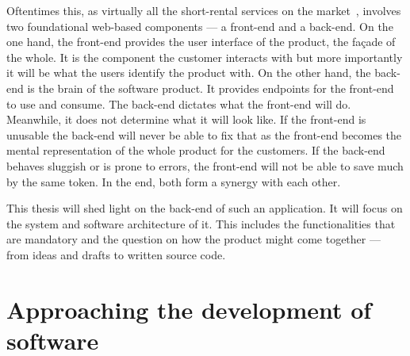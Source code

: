 \documentclass[12pt,a4paper]{report}
\begin{document}
Oftentimes this, as virtually all the short-rental services on the market~\cn,
involves two foundational web-based components --- a front-end and a back-end\cn.
On the one hand, the front-end provides the user interface of the product, the façade of the whole.
It is the component the customer interacts with but more importantly it will be
what the users identify the product with.
On the other hand, the back-end is the brain of the software product.
It provides endpoints for the front-end to use and consume. The back-end dictates
what the front-end will do. Meanwhile, it does not determine what it will look like.
If the front-end is unusable the back-end will never be able to fix that as the
front-end becomes the mental representation of the whole product for the customers.
If the back-end behaves sluggish or is prone to errors, the front-end will not
be able to save much by the same token. In the end, both form a synergy with each other.

This thesis will shed light on the back-end of such an application.
It will focus on the system and software architecture of it.
This includes the functionalities that are mandatory and the question on
how the product might come together --- from ideas and drafts to written source code.


\section{Approaching the development of software} \label{sect:software-development-process}
\end{document}
